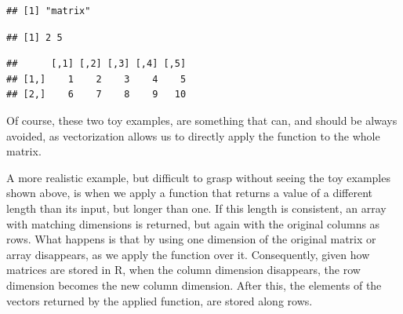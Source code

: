 \documentclass[krantz2]{krantz}\usepackage{knitr}%
\begin{document}
\begin{explainbox}
\begin{knitrout}\footnotesize
{}\color{fgcolor}\begin{kframe}
\begin{alltt}
 \hlkwb{<-} \hlstd{(}   \hlstd{=} \hlstd{,}  
\end{alltt}
\begin{verbatim}
## [1] "matrix"
\end{verbatim}
\begin{alltt}
\end{alltt}
\begin{verbatim}
## [1] 2 5
\end{verbatim}
\begin{alltt}
\end{alltt}
\begin{verbatim}
##      [,1] [,2] [,3] [,4] [,5]
## [1,]    1    2    3    4    5
## [2,]    6    7    8    9   10
\end{verbatim}
\end{kframe}
\end{knitrout}

Of course, these two toy examples, are something that can, and should be always avoided, as vectorization allows us to directly apply the function to the whole matrix.

\begin{knitrout}\footnotesize
{}\color{fgcolor}\begin{kframe}
\begin{alltt}
 \hlkwb{<-} 
\end{alltt}
\end{kframe}
\end{knitrout}

A more realistic example, but difficult to grasp without seeing the toy examples shown above, is when we apply a function that returns a value of a different length than its input, but longer than one. If this length is consistent, an array with matching dimensions is returned, but again with the original columns as rows. What happens is that by using  one dimension of the original matrix or array disappears, as we apply the function over it. Consequently, given how matrices are stored in R, when the column dimension disappears, the row dimension becomes the new column dimension. After this, the elements of the vectors returned by the applied function, are stored along rows.


\end{explainbox}
\end{document}
